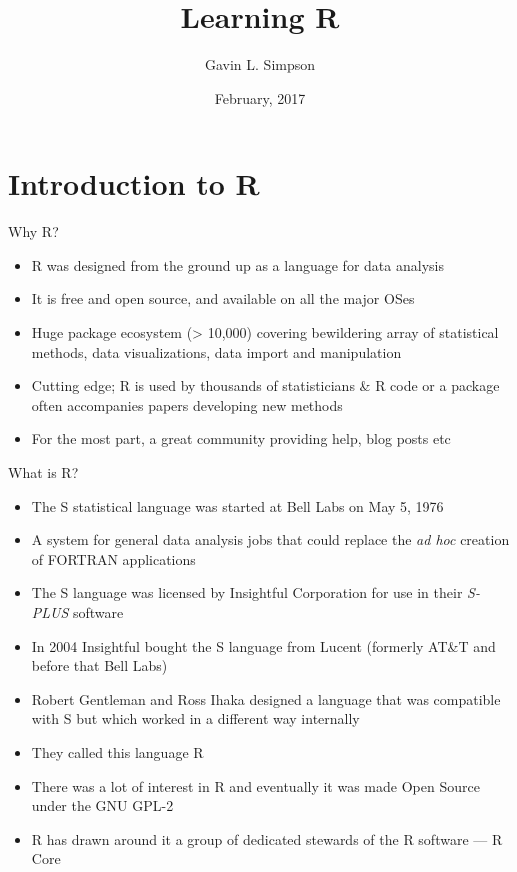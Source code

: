 \documentclass[10pt,ignorenonframetext,compress, aspectratio=169]{beamer}
\title{Learning R}
\author{Gavin L. Simpson}
\date{February, 2017}
\providecommand{\tightlist}{%
  \setlength{\itemsep}{0pt}\setlength{\parskip}{0pt}}
\begin{document}
\frame{\titlepage}

\section{Introduction to R}\label{introduction-to-r}

\begin{frame}{Why R?}

\begin{itemize}
\tightlist
\item
  R was designed from the ground up as a language for data analysis
\item
  It is free and open source, and available on all the major OSes
\item
  Huge package ecosystem (\textgreater{} 10,000) covering bewildering
  array of statistical methods, data visualizations, data import and
  manipulation
\item
  Cutting edge; R is used by thousands of statisticians \& R code or a
  package often accompanies papers developing new methods
\item
  For the most part, a great community providing help, blog posts etc
\end{itemize}

\end{frame}

\begin{frame}{What is R?}

\begin{itemize}
\tightlist
\item
  The S statistical language was started at Bell Labs on May 5, 1976
\item
  A system for general data analysis jobs that could replace the
  \emph{ad hoc} creation of FORTRAN applications
\item
  The S language was licensed by Insightful Corporation for use in their
  \emph{S-PLUS} software
\item
  In 2004 Insightful bought the S language from Lucent (formerly AT\&T
  and before that Bell Labs)
\item
  Robert Gentleman and Ross Ihaka designed a language that was
  compatible with S but which worked in a different way internally
\item
  They called this language R
\item
  There was a lot of interest in R and eventually it was made Open
  Source under the GNU GPL-2
\item
  R has drawn around it a group of dedicated stewards of the R software
  --- \alert{R Core}
\end{itemize}

\end{frame}
\end{document}
